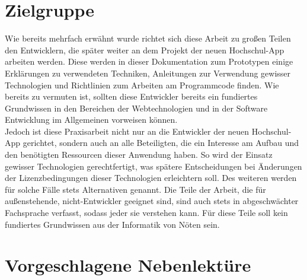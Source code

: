 \section{Zielgruppe}

Wie bereits mehrfach erwähnt wurde richtet sich diese Arbeit zu großen Teilen den Entwicklern, die später weiter an dem Projekt der neuen Hochschul-\ac{App} arbeiten werden. Diese werden in dieser Dokumentation zum Prototypen einige Erklärungen zu verwendeten Techniken, Anleitungen zur Verwendung gewisser Technologien und Richtlinien zum Arbeiten am Programmcode finden. Wie bereits zu vermuten ist, sollten diese Entwickler bereits ein fundiertes Grundwissen in den Bereichen der Webtechnologien und in der Software Entwicklung im Allgemeinen vorweisen können.\\
\linebreak
Jedoch ist diese Praxisarbeit nicht nur an die Entwickler der neuen Hochschul-\ac{App} gerichtet, sondern auch an alle Beteiligten, die ein Interesse am Aufbau und den benötigten Ressourcen dieser Anwendung haben. So wird der Einsatz gewisser Technologien gerechtfertigt, was spätere Entscheidungen bei Änderungen der Lizenzbedingungen dieser Technologien erleichtern soll. Des weiteren werden für solche Fälle stets Alternativen genannt. Die Teile der Arbeit, die für außenstehende, nicht-Entwickler geeignet sind, sind auch stets in abgeschwächter Fachsprache verfasst, sodass jeder sie verstehen kann. Für diese Teile soll kein fundiertes Grundwissen aus der Informatik von Nöten sein.

\section{Vorgeschlagene Nebenlektüre\label{sec:nebenlektuere}}

